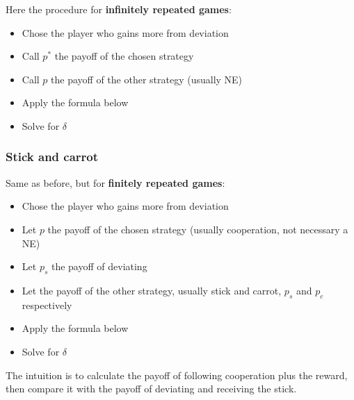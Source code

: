 Here the procedure for \textbf{infinitely repeated games}:
\begin{itemize}
    \item Chose the player who gains more from deviation
    \item Call $p^*$ the payoff of the chosen strategy
    \item Call $p$ the payoff of the other strategy (usually NE)
    \item Apply the formula below
    \item Solve for $\delta$
\end{itemize}

\subsubsection*{Stick and carrot}
Same as before, but for \textbf{finitely repeated games}:
\begin{itemize}
    \item Chose the player who gains more from deviation
    \item Let $p$ the payoff of the chosen strategy (usually cooperation, not necessary a NE)
    \item Let $p_s$ the payoff of deviating
    \item Let the payoff of the other strategy, usually stick and carrot, $p_s$ and $p_c$ respectively
    \item Apply the formula below
    \item Solve for $\delta$
\end{itemize}
The intuition is to calculate the payoff of following cooperation plus the reward, then compare it with the payoff of deviating and receiving the stick.
